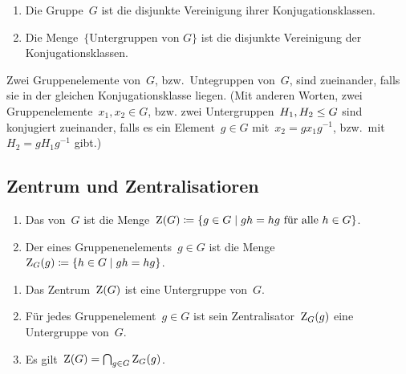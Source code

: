 \begin{proposition}
  \leavevmode
  \begin{enumerate}
    \item
      Die Gruppe~$G$ ist die disjunkte Vereinigung ihrer Konjugationsklassen.
    \item
      Die Menge~$\{ \text{Untergruppen von~$G$} \}$ ist die disjunkte Vereinigung der Konjugationsklassen.
  \end{enumerate}
\end{proposition}

\begin{definition}
  Zwei Gruppenelemente von~$G$, bzw.\ Untegruppen von~$G$, sind  zueinander, falls sie in der gleichen Konjugationsklasse liegen.
  (Mit anderen Worten, zwei Gruppenelemente~$x_1, x_2 \in G$, bzw. zwei Untergruppen~$H_1, H_2 \leq G$ sind konjugiert zueinander, falls es ein Element~$g \in G$ mit~$x_2 = g x_1 g^{-1}$, bzw.\ mit~$H_2 = g H_1 g^{-1}$ gibt.)
\end{definition}



\subsection{Zentrum und Zentralisatioren}

\begin{definition}
  \leavevmode
  \begin{enumerate}
    \item
      Das  von~$G$ ist die Menge~$\zenter(G) \defined \{ g \in G \suchthat \text{$g h = h g$ für alle~$h \in G$} \}$.
    \item
      Der  eines Gruppenenelements~$g \in G$ ist die Menge~$\zentralizer_G(g) \defined \{ h \in G \suchthat gh = hg \}$.
  \end{enumerate}
\end{definition}

\begin{proposition}
  \leavevmode
  \begin{enumerate}
    \item
      Das Zentrum~$\operatorname{Z}(G)$ ist eine Untergruppe von~$G$.
    \item
      Für jedes Gruppenelement~$g \in G$ ist sein Zentralisator~$\operatorname{Z}_G(g)$ eine Untergruppe von~$G$.
    \item
      Es gilt~$\operatorname{Z}(G) = \bigcap_{g \in G} \operatorname{Z}_G(g)$.
  \end{enumerate}
\end{proposition}



